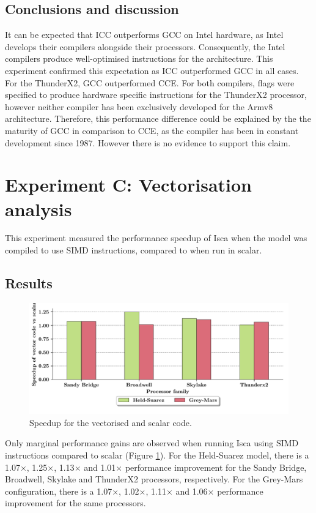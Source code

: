 \documentclass[a4paper,11pt]{report}
\begin{document}
\subsection{Conclusions and discussion}
It can be expected that ICC outperforms GCC on Intel hardware, as Intel develops their compilers alongside their processors. Consequently, the Intel compilers produce well-optimised instructions for the architecture. This experiment confirmed this expectation as ICC outperformed GCC in all cases. For the ThunderX2, GCC outperformed CCE. For both compilers, flags were specified to produce hardware specific instructions for the ThunderX2 processor, however neither compiler has been exclusively developed for the Armv8 architecture. Therefore, this performance difference could be explained by the the maturity of GCC in comparison to CCE, as the compiler has been in constant development since 1987. However there is no evidence to support this claim. 


\section{Experiment C: Vectorisation analysis}
This experiment measured the performance speedup of Isca when the model was compiled to use SIMD instructions, compared to when run in scalar.
\subsection{Results}
\begin{figure}[htbp]
\begin{center}
\includegraphics[width=\textwidth]{img/speedup-vector.pdf}
\caption{Speedup for the vectorised and scalar code. }
\label{fig:vector-gains}
\end{center}
\end{figure}
\par
Only marginal performance gains are observed when running Isca using SIMD instructions compared to scalar (Figure \ref{fig:vector-gains}). For the Held-Suarez model, there is a 1.07$\times$, 1.25$\times$, 1.13$\times$ and 1.01$\times$ performance improvement for the Sandy Bridge, Broadwell, Skylake and ThunderX2 processors, respectively. For the Grey-Mars configuration, there is a 1.07$\times$, 1.02$\times$, 1.11$\times$ and 1.06$\times$ performance improvement for the same processors.
\end{document}
